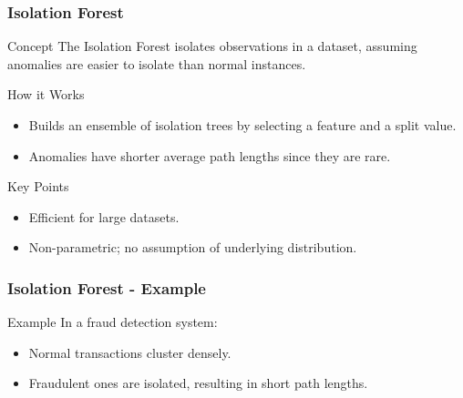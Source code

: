 \documentclass{beamer}
\begin{document}
\begin{frame}[fragile]
    \frametitle{Isolation Forest}
    \begin{block}{Concept}
        The Isolation Forest isolates observations in a dataset, assuming anomalies are easier to isolate than normal instances.
    \end{block}
    \begin{block}{How it Works}
        \begin{itemize}
            \item Builds an ensemble of isolation trees by selecting a feature and a split value.
            \item Anomalies have shorter average path lengths since they are rare.
        \end{itemize}
    \end{block}
    \begin{block}{Key Points}
        \begin{itemize}
            \item Efficient for large datasets.
            \item Non-parametric; no assumption of underlying distribution.
        \end{itemize}
    \end{block}
\end{frame}

\begin{frame}[fragile]
    \frametitle{Isolation Forest - Example}
    \begin{block}{Example}
        In a fraud detection system:
        \begin{itemize}
            \item Normal transactions cluster densely.
            \item Fraudulent ones are isolated, resulting in short path lengths.
        \end{itemize}
    \end{block}
\end{frame}
\end{document}
